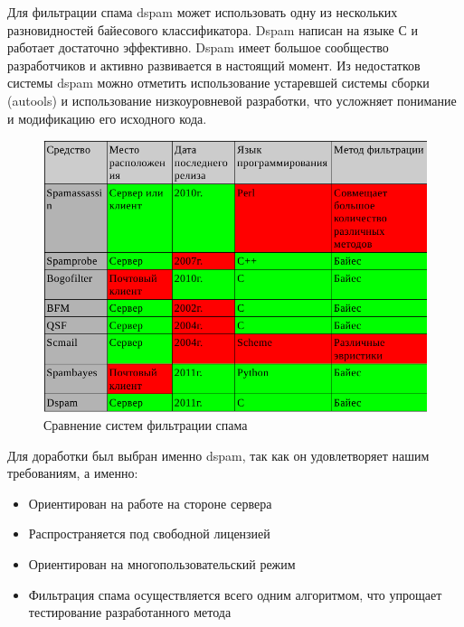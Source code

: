 Для фильтрации спама dspam может использовать одну из нескольких разновидностей байесового классификатора.
Dspam написан на языке С и работает достаточно эффективно. Dspam имеет большое сообщество разработчиков и активно развивается в настоящий момент.
Из недостатков системы dspam можно отметить использование устаревшей системы сборки (autools) и использование низкоуровневой разработки, что усложняет понимание и модификацию его исходного кода.
\begin{figure}[h]
\begin{center}
\includegraphics[width=13cm]{img/compare}
\end{center}
\caption{Сравнение систем фильтрации спама}
\label{spam_systems}
\end{figure}


Для доработки был выбран именно dspam, так как он удовлетворяет нашим требованиям, а именно:
\begin{itemize}
\item Ориентирован на работе на стороне сервера
\item Распространяется под свободной лицензией
\item Ориентирован на многопользовательский режим
\item Фильтрация спама осуществляется  всего одним алгоритмом, что упрощает тестирование разработанного метода
\end{itemize}

